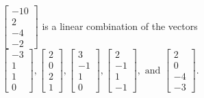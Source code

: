\begin{exercise}
\begin{exerciseStatement}
  \end{exerciseStatement}
  \begin{exerciseAnswer}
   \(\left[\begin{array}{c}
-10 \\
2 \\
-4 \\
-2
\end{array}\right]\) 
  	 is  
	a linear combination of the vectors \(\left[\begin{array}{c}
-3 \\
1 \\
1 \\
0
\end{array}\right] , \left[\begin{array}{c}
2 \\
0 \\
2 \\
1
\end{array}\right] , \left[\begin{array}{c}
3 \\
-1 \\
1 \\
0
\end{array}\right] , \left[\begin{array}{c}
2 \\
-1 \\
1 \\
-1
\end{array}\right] , \text{ and } \left[\begin{array}{c}
2 \\
0 \\
-4 \\
-3
\end{array}\right]\).

	
  


  \end{exerciseAnswer}
\end{exercise}